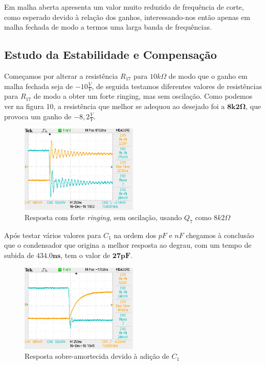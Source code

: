 \documentclass[a4paper]{article}
\begin{document}
        Em malha aberta apresenta um valor muito reduzido de frequência de corte, como esperado devido à relação dos ganhos, interessando-nos então apenas em malha fechada de modo a termos uma larga banda de frequências.
    
    \subsection{Estudo da Estabilidade e Compensação}
        \bigskip
        Começamos por alterar a resistência $R_{17}$ para $10k\Omega$ de modo que o ganho em malha fechada seja de $-10\frac{V}{V}$, de seguida testamos diferentes valores de resistências para $R_{17}$ de modo a obter um forte ringing, mas sem oscilação. Como podemos ver na figura 10, a resistência que melhor se adequou ao desejado foi a $\bm{8k2\Omega}$, que provoca um ganho de $-8,2\frac{V}{V}$.
        \begin{figure}[H]
            \centering
            \includegraphics[width=0.5\textwidth]{figura10_respostaRinging.JPG}
            \caption{\label{fig:respostaRinging}Resposta com forte \emph{ringing}, sem oscilação, usando $Q_7$ como $8k2\Omega$}
        \end{figure}
        \medskip
        
        Após testar vários valores para $C_1$ na ordem dos $pF$ e $nF$ chegamos à conclusão que o condensador que origina a melhor resposta ao degrau, com um tempo de subida de $\bm{434.0ns}$, tem o valor de $\bm{27pF}$. 
        \begin{figure}[H]
            \centering
            \includegraphics[width=0.5\textwidth]{figura11_respostaC1.JPG}
            \caption{\label{fig:respostaC1}Resposta sobre-amortecida devido à adição de $C_1$}
        \end{figure}
        \medskip
        
\end{document}
